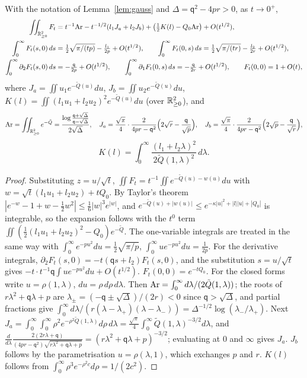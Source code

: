 \begin{lemma}[Integrals]\label{lem:integrals}
With the notation of Lemma~\ref{lem:gauss} and $\Delta=\mathsf q^2-4pr>0$, as $t\to0^+$,
\begin{align*}
\iint_{\mathbb{R}^2_{\ge0}}F_t&=t^{-1}\mathrm{Ar}-t^{-1/2}(l_1J_a+l_2J_b)+\bigl(\tfrac12K(l)-Q_0\mathrm{Ar}\bigr)+O(t^{1/2}),\\
\int_0^\infty F_t(s,0)\,ds&=\tfrac12\sqrt{\pi/(tp)}-\tfrac{l_1}{2p}+O(t^{1/2}),\qquad
\int_0^\infty F_t(0,s)\,ds=\tfrac12\sqrt{\pi/(tr)}-\tfrac{l_2}{2r}+O(t^{1/2}),\\
\int_0^\infty\partial_2F_t(s,0)\,ds&=-\tfrac{\mathsf q}{2p}+O(t^{1/2}),\qquad
\int_0^\infty\partial_1F_t(0,s)\,ds=-\tfrac{\mathsf q}{2r}+O(t^{1/2}),\qquad F_t(0,0)=1+O(t),
\end{align*}
where $J_a=\iint u_1e^{-\tilde Q(u)}du$, $J_b=\iint u_2e^{-\tilde Q(u)}du$, $K(l)=\iint(l_1u_1+l_2u_2)^2e^{-\tilde Q(u)}du$ (over $\mathbb{R}^2_{\ge0}$), and
\[
\mathrm{Ar}=\iint_{\mathbb{R}^2_{\ge0}}e^{-\tilde Q}=\frac{\log\frac{\mathsf q+\sqrt\Delta}{\mathsf q-\sqrt\Delta}}{2\sqrt\Delta},\quad
J_a=\frac{\sqrt\pi}4\cdot\frac{2}{4pr-\mathsf q^2}\Bigl(2\sqrt r-\frac{\mathsf q}{\sqrt p}\Bigr),\quad
J_b=\frac{\sqrt\pi}4\cdot\frac{2}{4pr-\mathsf q^2}\Bigl(2\sqrt p-\frac{\mathsf q}{\sqrt r}\Bigr),
\]
\[
K(l)=\int_0^\infty\frac{(l_1+l_2\lambda)^2}{2\tilde Q(1,\lambda)^2}\,d\lambda .
\]
\end{lemma}
\begin{proof}
Substituting $z=u/\sqrt t$, $\iint F_t=t^{-1}\iint e^{-\tilde Q(u)-w(u)}du$ with $w=\sqrt t(l_1u_1+l_2u_2)+tQ_0$. By Taylor's theorem
$|e^{-w}-1+w-\frac12w^2|\le\frac16|w|^3e^{|w|}$, and $e^{-\tilde Q(u)+|w(u)|}\le e^{-\kappa|u|^2+|l||u|+|Q_0|}$ is integrable, so the expansion follows with the
$t^0$ term $\iint(\frac12(l_1u_1+l_2u_2)^2-Q_0)e^{-\tilde Q}$. The one-variable integrals are treated in the same way with
$\int_0^\infty e^{-pu^2}du=\frac12\sqrt{\pi/p}$, $\int_0^\infty ue^{-pu^2}du=\frac1{2p}$. For the derivative integrals, $\partial_2F_t(s,0)=-t(\mathsf qs+l_2)F_t(s,0)$,
and the substitution $s=u/\sqrt t$ gives $-t\cdot t^{-1}\mathsf q\int ue^{-pu^2}du+O(t^{1/2})$. $F_t(0,0)=e^{-tQ_0}$.
For the closed forms write $u=\rho(1,\lambda)$, $du=\rho\,d\rho\,d\lambda$. Then $\mathrm{Ar}=\int_0^\infty d\lambda/(2\tilde Q(1,\lambda))$; the roots of
$r\lambda^2+\mathsf q\lambda+p$ are $\lambda_\pm=(-\mathsf q\pm\sqrt\Delta)/(2r)<0$ since $\mathsf q>\sqrt\Delta$, and partial fractions give
$\int_0^\infty d\lambda/(r(\lambda-\lambda_+)(\lambda-\lambda_-))=\Delta^{-1/2}\log(\lambda_-/\lambda_+)$. Next
$J_a=\int_0^\infty\int_0^\infty\rho^2e^{-\rho^2\tilde Q(1,\lambda)}d\rho\,d\lambda=\frac{\sqrt\pi}4\int_0^\infty\tilde Q(1,\lambda)^{-3/2}d\lambda$, and
$\frac{d}{d\lambda}\frac{2(2r\lambda+\mathsf q)}{(4pr-\mathsf q^2)\sqrt{r\lambda^2+\mathsf q\lambda+p}}=(r\lambda^2+\mathsf q\lambda+p)^{-3/2}$; evaluating at $0$ and $\infty$ gives $J_a$.
$J_b$ follows by the parametrisation $u=\rho(\lambda,1)$, which exchanges $p$ and $r$. $K(l)$ follows from $\int_0^\infty\rho^3e^{-\rho^2c}d\rho=1/(2c^2)$.
\end{proof}

